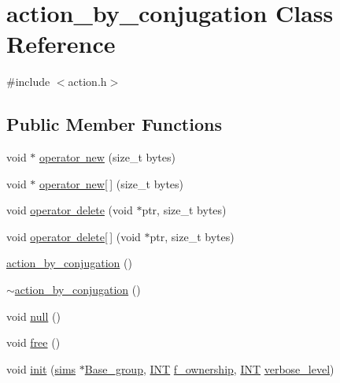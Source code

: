 \hypertarget{classaction__by__conjugation}{}\section{action\+\_\+by\+\_\+conjugation Class Reference}
\label{classaction__by__conjugation}


{\ttfamily \#include $<$action.\+h$>$}

\subsection*{Public Member Functions}
\begin{DoxyCompactItemize}
\item 
void $\ast$ \mbox{\hyperlink{classaction__by__conjugation_a0649a9e424fa5d9eed967501de97e3f3}{operator new}} (size\+\_\+t bytes)
\item 
void $\ast$ \mbox{\hyperlink{classaction__by__conjugation_ac563543b6eb2d1c861fd318c7a031007}{operator new\mbox{[}$\,$\mbox{]}}} (size\+\_\+t bytes)
\item 
void \mbox{\hyperlink{classaction__by__conjugation_a94fd63f468c02381446d3d666e34efdd}{operator delete}} (void $\ast$ptr, size\+\_\+t bytes)
\item 
void \mbox{\hyperlink{classaction__by__conjugation_aa3198b8a737c5a562939591dcbc7b04d}{operator delete\mbox{[}$\,$\mbox{]}}} (void $\ast$ptr, size\+\_\+t bytes)
\item 
\mbox{\hyperlink{classaction__by__conjugation_af967d24d993447fe0aebd2f7410da85a}{action\+\_\+by\+\_\+conjugation}} ()
\item 
\mbox{\hyperlink{classaction__by__conjugation_a6e359f32a3ecfbf1b209723db2040839}{$\sim$action\+\_\+by\+\_\+conjugation}} ()
\item 
void \mbox{\hyperlink{classaction__by__conjugation_aadc034b92d79634208c083893675331e}{null}} ()
\item 
void \mbox{\hyperlink{classaction__by__conjugation_a6a7deae7eb106313e5f49bef8f913cbd}{free}} ()
\item 
void \mbox{\hyperlink{classaction__by__conjugation_abf94201a9e107f18dbc163ff58706e77}{init}} (\mbox{\hyperlink{classsims}{sims}} $\ast$\mbox{\hyperlink{classaction__by__conjugation_a164a92341adcacb33cbd66124e6412c9}{Base\+\_\+group}}, \mbox{\hyperlink{galois_8h_a09fddde158a3a20bd2dcadb609de11dc}{I\+NT}} \mbox{\hyperlink{classaction__by__conjugation_aff09de68973f71b4509b82602b8ac000}{f\+\_\+ownership}}, \mbox{\hyperlink{galois_8h_a09fddde158a3a20bd2dcadb609de11dc}{I\+NT}} \mbox{\hyperlink{simeon_8_c_a818073fbcc2f439e7c56952f67386122}{verbose\+\_\+level}})

\end{DoxyCompactItemize}
